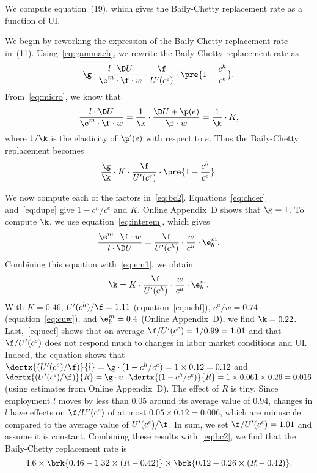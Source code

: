 \documentclass[letterpaper,12pt,leqno]{article}
\begin{document}
We compute equation~(19), which gives the Baily-Chetty replacement rate as a function of UI.

We begin by reworking the expression of the Baily-Chetty replacement rate in~(11). Using~\eqref{eq:gammaeh}, we rewrite the Baily-Chetty replacement rate as
\begin{equation*}
\g\cdot \frac{l\cdot \D U}{\e^{m} \cdot \f\cdot w}\cdot\frac{\f}{U'(c^{e})}\cdot \pre{1-\frac{c^{h}}{c^{e}}}.
\end{equation*}
From~\eqref{eq:micro}, we know that
\begin{equation}
\frac{l\cdot \D U}{\e^{m}\cdot\f\cdot w}=\frac{1}{\k}\cdot	\frac{\D U+\p(e)}{\f\cdot w} = \frac{1}{\k}\cdot K,
\label{eq:em1}\end{equation}
where $1/\k$ is the elasticity of $\p'(e)$ with respect to $e$. Thus the Baily-Chetty replacement becomes
\begin{equation}
\frac{\g}{\k}\cdot K\cdot\frac{\f}{U'(c^{e})}\cdot \pre{1-\frac{c^{h}}{c^{e}}}.
\label{eq:bc2}\end{equation}

We now compute each of the factors in~\eqref{eq:bc2}. Equations~\eqref{eq:chcer} and~\eqref{eq:dupe} give $1-c^h/c^e$ and $K$. Online Appendix~D  shows that $\g=1$. To compute $\k$, we use equation~\eqref{eq:interem}, which gives
\begin{equation*}
\frac{\e^m\cdot\f\cdot w}{l\cdot \D U}= \frac{\f}{U'(c^{h})} \cdot \frac{w}{c^{u}}\cdot\e^{m}_{b}.
\end{equation*}
Combining this equation with~\eqref{eq:em1}, we obtain
\begin{equation}
\k=K\cdot \frac{\f}{U'(c^{h})} \cdot \frac{w}{c^{u}} \cdot\e^{m}_{b}.
\label{eq:kappa}\end{equation}
With $K=0.46$, $U'(c^{h})/\f=1.11$ (equation~\eqref{eq:uchf}), $c^{u}/w=0.74$ (equation~\eqref{eq:cuw}), and $\e^{m}_{b}=0.4$ (Online Appendix~D), we find $\k=0.22$. Last,~\eqref{eq:ucef} shows that on average $\f/U'(c^{e})=1/0.99=1.01$ and that $\f/U'(c^{e})$ does not respond much to changes in labor market conditions and UI. Indeed, the equation shows that $\dertx{(U'(c^{e})/\f)}{l}= \g \cdot (1-c^h/c^e) = 1\times 0.12 =0.12$ and $\dertx{(U'(c^{e})/\f)}{R}= \g\cdot u\cdot \dertx{(1-c^{h}/c^e)}{R} =1\times 0.061\times 0.26 = 0.016$ (using estimates from Online Appendix~D). The effect of $R$ is tiny. Since employment $l$ moves by less than $0.05$ around its average value of $0.94$, changes in $l$ have effects on $\f/U'(c^{e})$ of at most $0.05\times 0.12 =0.006$, which are minuscule compared to the average value of $U'(c^{e})/\f$. In sum, we set $\f/U'(c^{e})=1.01$ and assume it is constant. Combining these results with~\eqref{eq:bc2}, we find that the Baily-Chetty replacement rate is
\begin{equation*}
4.6\times \brk{0.46-1.32\times (R-0.42)} \times \brk{0.12-0.26\times (R-0.42)}.
\end{equation*}
\end{document}
